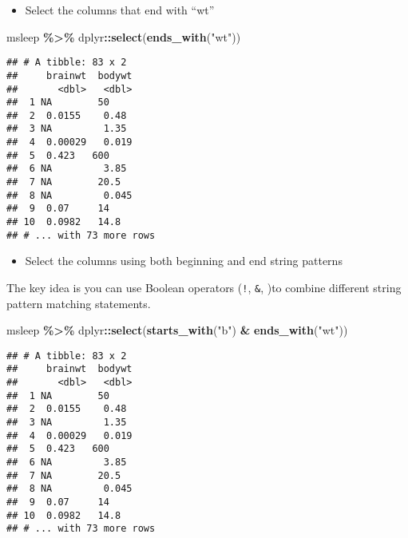 \documentclass[
]{book}
\newenvironment{Shaded}{\begin{snugshade}}{\end{snugshade}}
\newcommand{\KeywordTok}[1]{\textcolor[rgb]{0.13,0.29,0.53}{\textbf{#1}}}
\newcommand{\NormalTok}[1]{#1}
\newcommand{\OperatorTok}[1]{\textcolor[rgb]{0.81,0.36,0.00}{\textbf{#1}}}
\newcommand{\StringTok}[1]{\textcolor[rgb]{0.31,0.60,0.02}{#1}}
\providecommand{\tightlist}{%
  \setlength{\itemsep}{0pt}\setlength{\parskip}{0pt}}
\begin{document}
\begin{itemize}
\tightlist
\item
  Select the columns that end with ``wt''
\end{itemize}

\begin{Shaded}
\begin{Highlighting}[]
\NormalTok{msleep }\OperatorTok{\%\textgreater{}\%}
\StringTok{  }\NormalTok{dplyr}\OperatorTok{::}\KeywordTok{select}\NormalTok{(}\KeywordTok{ends\_with}\NormalTok{(}\StringTok{"wt"}\NormalTok{))}
\end{Highlighting}
\end{Shaded}

\begin{verbatim}
## # A tibble: 83 x 2
##     brainwt  bodywt
##       <dbl>   <dbl>
##  1 NA        50    
##  2  0.0155    0.48 
##  3 NA         1.35 
##  4  0.00029   0.019
##  5  0.423   600    
##  6 NA         3.85 
##  7 NA        20.5  
##  8 NA         0.045
##  9  0.07     14    
## 10  0.0982   14.8  
## # ... with 73 more rows
\end{verbatim}

\begin{itemize}
\tightlist
\item
  Select the columns using both beginning and end string patterns
\end{itemize}

The key idea is you can use Boolean operators (\texttt{!}, \texttt{\&}, \texttt{\textbar{}})to combine different string pattern matching statements.

\begin{Shaded}
\begin{Highlighting}[]
\NormalTok{msleep }\OperatorTok{\%\textgreater{}\%}
\StringTok{  }\NormalTok{dplyr}\OperatorTok{::}\KeywordTok{select}\NormalTok{(}\KeywordTok{starts\_with}\NormalTok{(}\StringTok{"b"}\NormalTok{) }\OperatorTok{\&}\StringTok{ }\KeywordTok{ends\_with}\NormalTok{(}\StringTok{"wt"}\NormalTok{))}
\end{Highlighting}
\end{Shaded}

\begin{verbatim}
## # A tibble: 83 x 2
##     brainwt  bodywt
##       <dbl>   <dbl>
##  1 NA        50    
##  2  0.0155    0.48 
##  3 NA         1.35 
##  4  0.00029   0.019
##  5  0.423   600    
##  6 NA         3.85 
##  7 NA        20.5  
##  8 NA         0.045
##  9  0.07     14    
## 10  0.0982   14.8  
## # ... with 73 more rows
\end{verbatim}
\end{document}
